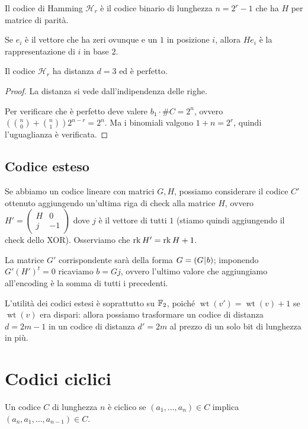 \documentclass[a4paper]{book}
\DeclareMathOperator{\wt}{wt}
\begin{document}
    Il codice di Hamming $\mathcal H_r$ è il codice binario di lunghezza $n=2^r-1$ che ha $H$ per matrice di parità.

    \begin{oss}
        Se $e_i$ è il vettore che ha zeri ovunque e un $1$ in posizione $i$, allora $He_i$ è la rappresentazione di $i$ in base $2$.
    \end{oss}

    \begin{proposition}
        Il codice $\mathcal H_r$ ha distanza $d=3$ ed è perfetto.
    \end{proposition}
    \begin{proof}
        La distanza si vede dall'indipendenza delle righe.

        Per verificare che è perfetto deve valere $b_1\cdot \# C=2^n$, ovvero $\left(\binom{n}{0}+\binom{n}{1}\right) 2^{n-r}=2^n$. Ma i binomiali valgono $1+n=2^r$, quindi l'uguaglianza è verificata.
    \end{proof}

    \subsection{Codice esteso}

    Se abbiamo un codice lineare con matrici $G,H$, possiamo considerare il codice $C'$ ottenuto aggiungendo un'ultima riga di check alla matrice $H$, ovvero $H'=\begin{pmatrix}
    H & 0\\ j & -1
    \end{pmatrix}$ dove $j$ è il vettore di tutti $1$ (stiamo quindi aggiungendo il check dello XOR). Osserviamo che $\operatorname{rk} H'=\operatorname{rk} H+1$.

    La matrice $G'$ corrispondente sarà della forma $G=(G\,\vline\, b)$; imponendo $G'(H')^t=0$ ricaviamo $b=Gj$, ovvero l'ultimo valore che aggiungiamo all'encoding è la somma di tutti i precedenti.

    L'utilità dei codici estesi è soprattutto su $\mathbb{F}_2$, poiché $\wt(v')=\wt(v)+1$ se $\wt(v)$ era dispari: allora possiamo trasformare un codice di distanza $d=2m-1$ in un codice di distanza $d'=2m$ al prezzo di un solo bit di lunghezza in più.

    \section{Codici ciclici}

    \begin{definition}
        Un codice $C$ di lunghezza $n$ è ciclico se $(a_1,\dots,a_n)\in C$ implica $(a_n,a_1,\dots,a_{n-1})\in C$.
    \end{definition}
\end{document}
